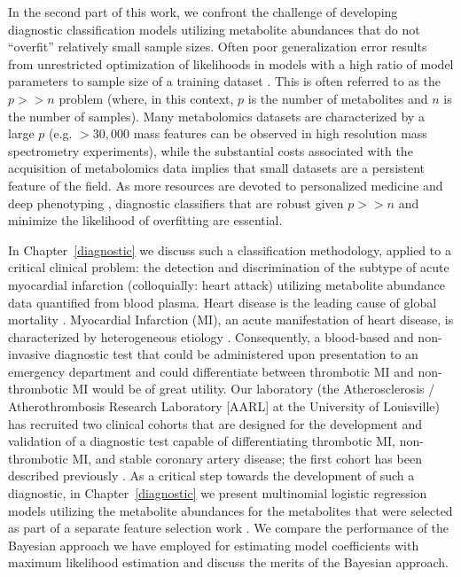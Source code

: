 \begin{DoubleSpace*}
In the second part of this work, we confront the challenge of developing diagnostic classification models utilizing metabolite abundances that do not ``overfit'' relatively small sample sizes. Often poor generalization error results from unrestricted optimization of likelihoods in models with a high ratio of model parameters to sample size of a training dataset \cite{hastie2009}. This is often referred to as the $p>>n$ problem (where, in this context, $p$ is the number of metabolites and $n$ is the number of samples). Many metabolomics datasets are characterized by a large $p$ (e.g. $>30,000$ mass features can be observed in high resolution mass spectrometry experiments), while the substantial costs associated with the acquisition of metabolomics data implies that small datasets are a persistent feature of the field. As more resources are devoted to personalized medicine \cite{hamburg2010,wishart2016} and deep phenotyping \cite{delude2015}, diagnostic classifiers that are robust given $p>>n$ and minimize the likelihood of overfitting are essential. 

In Chapter~\ref{diagnostic} we discuss such a classification methodology, applied to a critical clinical problem: the detection and discrimination of the subtype of acute myocardial infarction (colloquially: heart attack) utilizing metabolite abundance data quantified from blood plasma. Heart disease is the leading cause of global mortality \cite{benjamin2017}. Myocardial Infarction (MI), an acute manifestation of heart disease, is characterized by heterogeneous etiology \cite{thygesen2012}. Consequently, a blood-based and non-invasive diagnostic test that could be administered upon presentation to an emergency department and could differentiate between thrombotic MI and non-thrombotic MI would be of great utility. Our laboratory (the Atherosclerosis / Atherothrombosis Research Laboratory [AARL] at the University of Louisville) has recruited two clinical cohorts that are designed for the development and validation of a diagnostic test capable of differentiating thrombotic MI, non-thrombotic MI, and stable coronary artery disease; the first cohort has been described previously \cite{defilippis2015,defilippis2017,trainor2017}. As a critical step towards the development of such a diagnostic, in Chapter~\ref{diagnostic} we present multinomial logistic regression models utilizing the metabolite abundances for the metabolites that were selected as part of a separate feature selection work \cite{trainor2018}. We compare the performance of the Bayesian approach we have employed for estimating model coefficients with maximum likelihood estimation and discuss the merits of the Bayesian approach. 


\end{DoubleSpace*}
